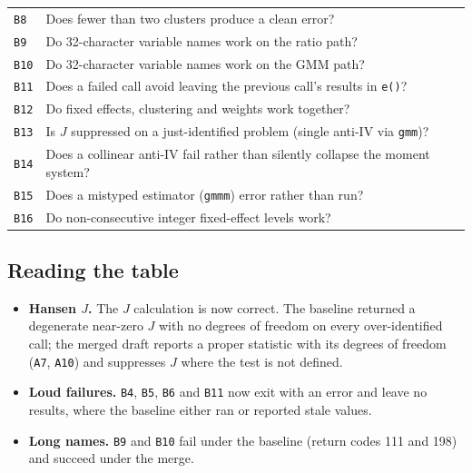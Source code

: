 \documentclass[11pt]{article}
\newcommand{\code}[1]{\texttt{\small #1}}
\begin{document}
\begin{table}[htbp]
\begin{tabular}{ll}
\code{B8}   & Does fewer than two clusters produce a clean error? \\
\code{B9}   & Do 32-character variable names work on the ratio path? \\
\code{B10}  & Do 32-character variable names work on the GMM path? \\
\code{B11}  & Does a failed call avoid leaving the previous call's results in \code{e()}? \\
\code{B12}  & Do fixed effects, clustering and weights work together? \\
\code{B13}  & Is $J$ suppressed on a just-identified problem (single anti-IV via \code{gmm})? \\
\code{B14}  & Does a collinear anti-IV fail rather than silently collapse the moment system? \\
\code{B15}  & Does a mistyped estimator (\code{gmmm}) error rather than run? \\
\code{B16}  & Do non-consecutive integer fixed-effect levels work? \\
\bottomrule
\end{tabular}
\end{table}

\newcommand{\resultsnotes}{\textit{Notes.} ``--'' means the quantity was not returned.
Baseline rows with a non-zero return code still report a coefficient because the
baseline left the previous call's results in \code{e()}; the merged draft clears them.
Return code 101 is the refusal of \code{[aw=]} or \code{[fw=]} on the GMM path, 459 the
refusal of non-positive weights, 430 the singular anti-IV system, and 111 and 198 on the
baseline the long-name failures the merge repairs; 198 on merged \code{B15} is the
intended rejection of the mistyped estimator.}



\subsection*{Reading the table}

\begin{itemize}
  \item \textbf{Hansen $J$.} The $J$ calculation is now correct. The baseline returned a
        degenerate near-zero $J$ with no degrees of freedom on every over-identified
        call; the merged draft reports a proper statistic with its degrees of freedom
        (\code{A7}, \code{A10}) and suppresses $J$ where the test is not defined.
  \item \textbf{Loud failures.} \code{B4}, \code{B5}, \code{B6} and \code{B11} now exit
        with an error and leave no results, where the baseline either ran or reported
        stale values.
  \item \textbf{Long names.} \code{B9} and \code{B10} fail under the baseline
        (return codes 111 and 198) and succeed under the merge.
\end{itemize}
\end{document}
